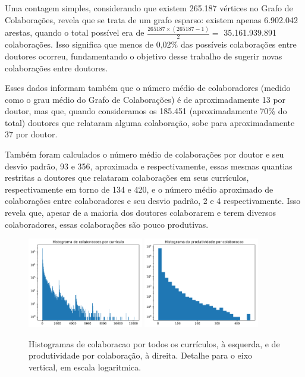 \documentclass[12pt]{article}
\begin{document}
Uma contagem simples, considerando que existem 265.187 vértices no Grafo de Colaborações, revela que se trata de um grafo esparso: existem apenas 6.902.042 arestas, quando o total possível era de $\frac{265187 \times (265187 - 1)}{2} =$ 35.161.939.891 colaborações.
Isso significa que menos de 0,02\% das possíveis colaborações entre doutores ocorreu, fundamentando o objetivo desse trabalho de sugerir novas colaborações entre doutores.

Esses dados informam também que o número médio de colaboradores (medido como o grau médio do Grafo de Colaborações) é de aproximadamente 13 por doutor, mas que, quando consideramos os 185.451 (aproximadamente 70\% do total) doutores que relataram alguma colaboração, sobe para aproximadamente 37 por doutor.

Também foram calculados o número médio de colaborações por doutor e seu desvio padrão, 93 e 356, aproximada e respectivamente, essas mesmas quantias restritas a doutores que relataram colaborações em seus currículos, respectivamente em torno de 134 e 420, e o número médio aproximado de colaborações entre colaboradores e seu desvio padrão, 2 e 4 respectivamente.
Isso revela que, apesar de a maioria dos doutores colaborarem e terem diversos colaboradores, essas colaborações são pouco produtivas.

\begin{figure}
\centering
  \includegraphics[width=0.45\textwidth]{graphs/degree_histogram.pdf}
  \includegraphics[width=0.45\textwidth]{graphs/weight_histogram.pdf}
  \caption{Histogramas de colaboracao por todos os currículos, à esquerda, e de produtividade por colaboração, à direita. Detalhe para o eixo vertical, em escala logaritmica.}
  \label{fig:collabs}
\end{figure}
\end{document}
